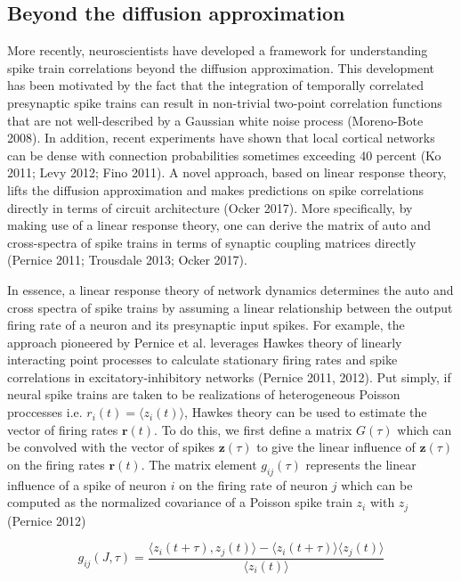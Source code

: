 \documentclass{ucetd}
\begin{document}
\subsection{Beyond the diffusion approximation}

More recently, neuroscientists have developed a framework for understanding spike train correlations beyond the diffusion approximation. This development has been motivated by the fact that the integration of temporally correlated presynaptic spike trains can result in non-trivial two-point correlation functions that are not well-described by a Gaussian white noise process (Moreno-Bote 2008). In addition, recent experiments have shown that local cortical networks can be dense with connection probabilities sometimes exceeding 40 percent (Ko 2011; Levy 2012; Fino 2011). A novel approach, based on linear response theory, lifts the diffusion approximation and makes predictions on spike correlations directly in terms of circuit architecture (Ocker 2017). More specifically, by making use of a linear response theory, one can derive the matrix of auto and cross-spectra of spike trains in terms of synaptic coupling matrices directly (Pernice 2011; Trousdale 2013; Ocker 2017).

In essence, a linear response theory of network dynamics determines the auto and cross spectra of spike trains by assuming a linear relationship between the output firing rate of a neuron and its presynaptic input spikes. For example, the approach pioneered by Pernice et al. leverages Hawkes theory of linearly interacting point processes to calculate stationary firing rates and spike correlations in excitatory-inhibitory networks (Pernice 2011, 2012). Put simply, if neural spike trains are taken to be realizations of heterogeneous Poisson proccesses i.e. $r_{i}(t) = \langle z_{i}(t)\rangle$, Hawkes theory can be used to estimate the vector of firing rates $\mathbf{r}(t)$. To do this, we first define a matrix $G(\tau)$ which can be convolved with the vector of spikes $\mathbf{z}(\tau)$ to give the linear influence of $\mathbf{z}(\tau)$ on the firing rates $\mathbf{r}(t)$. The matrix element $g_{ij}(\tau)$ represents the linear influence of a spike of neuron $i$ on the firing rate of neuron $j$ which can be computed as the normalized covariance of a Poisson spike train $z_{i}$ with $z_{j}$ (Pernice 2012)

\begin{equation}
g_{ij}(J,\tau) = \frac{\langle z_{i}(t+\tau), z_{j}(t)\rangle - \langle z_{i}(t+\tau)\rangle\langle z_{j}(t)\rangle}{\langle z_{i}(t)\rangle}
\end{equation} 
\end{document}
